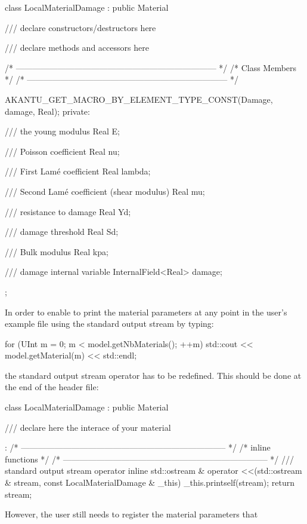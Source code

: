 \begin{cpp}
class LocalMaterialDamage : public Material {

/// declare constructors/destructors here

/// declare methods and accessors here

  /* ------------------------------------------------------------------------ */
  /* Class Members                                                            */
  /* ------------------------------------------------------------------------ */

  AKANTU_GET_MACRO_BY_ELEMENT_TYPE_CONST(Damage, damage, Real);
private:

  /// the young modulus
  Real E;

  /// Poisson coefficient
  Real nu;

  /// First Lamé coefficient
  Real lambda;

  /// Second Lamé coefficient (shear modulus)
  Real mu;

  /// resistance to damage
  Real Yd;

  /// damage threshold
  Real Sd;

  /// Bulk modulus
  Real kpa;

  /// damage internal variable
  InternalField<Real> damage;

};
\end{cpp}
In order to enable to print the material parameters at any point in
the user's example file using the standard output stream by typing:
\begin{cpp}
for (UInt m = 0; m  < model.getNbMaterials(); ++m) 
  std::cout << model.getMaterial(m) << std::endl;
\end{cpp}
the standard output stream operator has to be redefined. This should be done at the end of the header file:
\begin{cpp}
class LocalMaterialDamage : public Material {

  /// declare here the interace of your material

}:
/* -------------------------------------------------------------------------- */
/* inline functions                                                           */
/* -------------------------------------------------------------------------- */
/// standard output stream operator
inline std::ostream & operator <<(std::ostream & stream, const LocalMaterialDamage & _this)
{
  _this.printself(stream);
  return stream;
}
\end{cpp}
However, the user still needs to register the material parameters that
